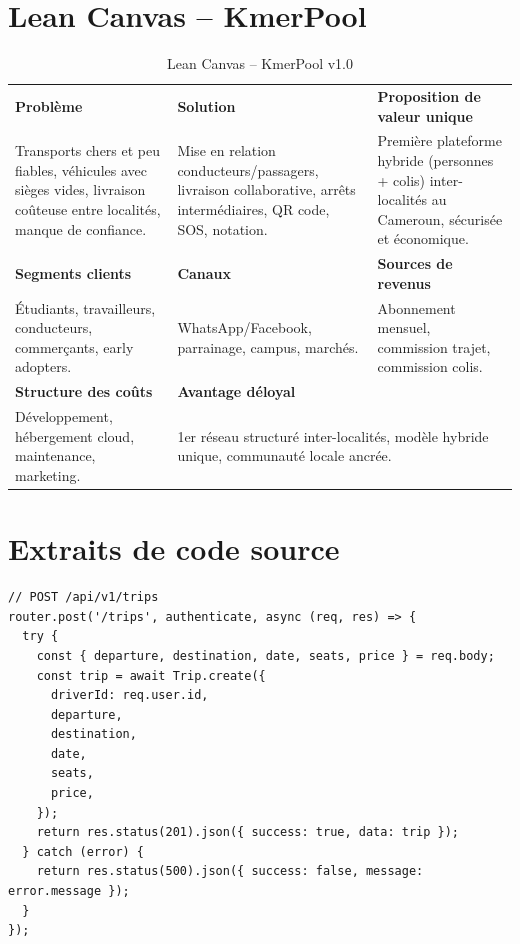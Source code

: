 \documentclass[12pt, a4paper]{report}
\begin{document}
\appendix
\chapter{Lean Canvas -- KmerPool}

\begin{table}[H]
\centering
\caption{Lean Canvas -- KmerPool v1.0}
\label{tab:leancanvas}
\renewcommand{\arraystretch}{1.5}
\begin{tabularx}{\textwidth}{|X|X|X|}
\hline
\textbf{Problème} & \textbf{Solution} & \textbf{Proposition de valeur unique} \\
Transports chers et peu fiables, véhicules avec sièges vides, livraison coûteuse entre localités, manque de confiance. &
Mise en relation conducteurs/passagers, livraison collaborative, arrêts intermédiaires, QR code, SOS, notation. &
Première plateforme hybride (personnes + colis) inter-localités au Cameroun, sécurisée et économique. \\
\hline
\textbf{Segments clients} & \textbf{Canaux} & \textbf{Sources de revenus} \\
Étudiants, travailleurs, conducteurs, commerçants, early adopters. &
WhatsApp/Facebook, parrainage, campus, marchés. &
Abonnement mensuel, commission trajet, commission colis. \\
\hline
\textbf{Structure des coûts} & \multicolumn{2}{X|}{\textbf{Avantage déloyal}} \\
Développement, hébergement cloud, maintenance, marketing. &
\multicolumn{2}{X|}{1er réseau structuré inter-localités, modèle hybride unique, communauté locale ancrée.} \\
\hline
\end{tabularx}
\end{table}

\chapter{Extraits de code source}


\begin{lstlisting}[caption={Exemple -- Endpoint de création de trajet (Node.js / Express)}, label={lst:trajet}]
// POST /api/v1/trips
router.post('/trips', authenticate, async (req, res) => {
  try {
    const { departure, destination, date, seats, price } = req.body;
    const trip = await Trip.create({
      driverId: req.user.id,
      departure,
      destination,
      date,
      seats,
      price,
    });
    return res.status(201).json({ success: true, data: trip });
  } catch (error) {
    return res.status(500).json({ success: false, message: error.message });
  }
});
\end{lstlisting}

\end{document}
